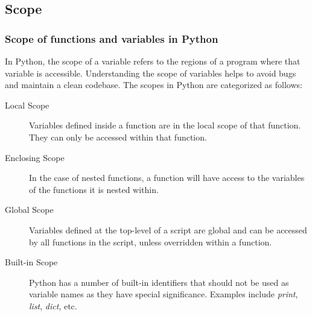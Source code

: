 \subsection{Scope}
\begin{frame}
  \frametitle{Scope of functions and variables in Python}

  In Python, the scope of a variable refers to the regions of a program where that variable is accessible. Understanding the scope of variables helps to avoid bugs and maintain a clean codebase. The scopes in Python are categorized as follows:

  \begin{description}
    \item[Local Scope] Variables defined inside a function are in the local scope of that function. They can only be accessed within that function.
    \item[Enclosing Scope] In the case of nested functions, a function will have access to the variables of the functions it is nested within.
    \item[Global Scope] Variables defined at the top-level of a script are global and can be accessed by all functions in the script, unless overridden within a function.
    \item[Built-in Scope] Python has a number of built-in identifiers that should not be used as variable names as they have special significance. Examples include \textit{print}, \textit{list}, \textit{dict}, etc.
  \end{description}

\end{frame}

